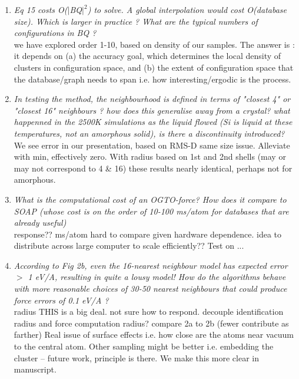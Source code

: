 \documentclass[11pt,twoside]{article}
\begin{document}
\begin{enumerate}
\item{\it
Eq 15 costs O($|$BQ$|^2$) to solve. A global interpolation would cost
   O(database size). Which is larger in practice ? What are the
   typical numbers of configurations in BQ ?
}\\[0.1in]
we have explored order 1-10, based on density of our samples. 
The answer is : it depends on (a) the accuracy goal, which determines the local density of clusters in configuration space, and (b) the extent of configuration space that the database/graph needs to span i.e. how interesting/ergodic is the process.

\item{\it
In testing the method, the neighbourhood is defined in terms of
   "closest 4" or "closest 16" neighbours ? how does this generalise
   away from a crystal? what happenned in the 2500K simulations as the
   liquid flowed (Si is liquid at these temperatures, not an amorphous
   solid), is there a discontinuity introduced?
}\\[0.1in]
We see error in our presentation, based on RMS-D same size issue. 
Alleviate with min, effectively zero.  
With radius based on 1st and 2nd shells (may or may not correspond to 4 \& 16)
these results nearly identical, perhaps not for amorphous.

\item{\it
What is the computational cost of an OGTO-force? How does it compare to
SOAP
   (whose cost is on the order of 10-100 ms/atom for databases that
   are already useful)
}\\[0.1in]
response?? ms/atom hard to compare given hardware dependence. 
idea to distribute across large computer to scale efficiently??
Test on ...

\item{\it
According to Fig 2b, even the 16-nearest neighbour model has
   expected error $>$ 1 eV/A, resulting in quite a lousy model! How do
   the algorithms behave with more reasonable choices of 30-50 nearest
   neighbours that could produce force errors of 0.1 eV/A ?
}\\[0.1in]
radius THIS is a big deal. not sure how to respond. decouple identification radius and force computation radius?
compare 2a to 2b (fewer contribute as farther)
Real issue of surface effects i.e. how close are the atoms near vacuum to the central atom. 
Other sampling might be better i.e. embedding the cluster -- future work, principle is there.
We make this more clear in manuscript.


\end{enumerate}
\end{document}
